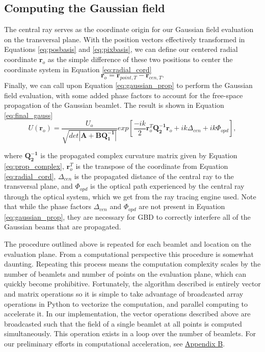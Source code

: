 \subsection{Computing the Gaussian field}
The central ray serves as the coordinate origin for our Gaussian field evaluation on the transversal plane. With the position vectors effectively transformed in Equations \ref{eq:posbasis} and \ref{eq:pixbasis}, we can define our centered radial coordinate $\mathbf{r}_{o}$ as the simple difference of these two positions to center the coordinate system in Equation \ref{eq:radial_cord}
\begin{equation}
    \mathbf{r}_{o} = \mathbf{r}_{point,T} - \mathbf{r}_{cen,T}.
    \label{eq:radial_cord}
\end{equation}
Finally, we can call upon Equation \ref{eq:gaussian_prop} to perform the Gaussian field evaluation, with some added phase factors to account for the free-space propagation of the Gaussian beamlet. The result is shown in Equation \ref{eq:final_gauss}
\begin{equation}
    U(\mathbf{r}_{o}) = \frac{U_{o}}{\sqrt{det|\mathbf{A} + \mathbf{BQ_{1}^{-1}}|}} exp[\frac{-ik}{2} \mathbf{r}^{T}_{o} \mathbf{Q_{2}^{-1}} \mathbf{r}_{o} + ik\Delta_{cen} + ik\Phi_{opd}],
    \label{eq:final_gauss}
\end{equation}

where $\mathbf{Q_{2}^{-1}}$ is the propagated complex curvature matrix given by Equation \ref{eq:prop_complex}, $\mathbf{r}_{o}^{T}$ is the transpose of the coordinate from Equation \ref{eq:radial_cord}, $\Delta_{cen}$ is the propagated distance of the central ray to the transversal plane, and $\Phi_{opd}$ is the optical path experienced by the central ray through the optical system, which we get from the ray tracing engine used. Note that while the phase factors  $\Delta_{cen}$ and $\Phi_{opd}$ are not present in Equation \ref{eq:gaussian_prop}, they are necessary for GBD to correctly interfere all of the Gaussian beams that are propagated.

The procedure outlined above is repeated for each beamlet and location on the evaluation plane. From a computational perspective this procedure is somewhat daunting. Repeating this process means the computation complexity scales by the number of beamlets and number of points on the evaluation plane, which can quickly become prohibitive. Fortunately, the algorithm described is entirely vector and matrix operations so it is simple to take advantage of broadcasted array operations in Python to vectorize the computation, and parallel computing to accelerate it. In our implementation, the vector operations described above are broadcasted such that the field of a single beamlet at all points is computed simultaneously. This operation exists in a loop over the number of beamlets. For our preliminary efforts in computational acceleration, see \hyperref[sec:appendixB]{Appendix B}.

